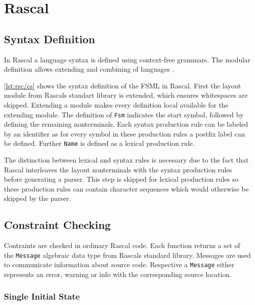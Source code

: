 \section{Rascal}

\subsection{Syntax Definition}

In Rascal a language syntax is defined using context-free grammars.
The modular definition allows extending and combining of languages \cite{van2011rascal}.

\autoref{lst:rsc/cs} shows the syntax definition of the FSML in Rascal.
First the layout module from Rascals standart library is extended, which ensures whitespaces are skipped.
Extending a module makes every definition local available for the extending module.
The definition of \lstinline[language=rascal]{Fsm} indicates the start symbol, followed by defining the remaining nonterminals.
Each syntax production rule can be labeled by an identifier as for every symbol in these production rules a postfix label can be defined.
Further \lstinline{Name} is defined as a lexical production rule.

The distinction between lexical and syntax rules is necessary due to the fact that Rascal interleaves the layout nonterminals with the syntax production rules before generating a parser.
This step is skipped for lexical production rules so these production rules can contain character sequences which would otherwise be skipped by the parser.



\subsection{Constraint Checking}

Contraints are checked in ordinary Rascal code.
Each function returns a set of the \lstinline{Message} algebraic data type from Rascals standard library.
Messages are used to communicate information about source code.
Respective a \lstinline{Message} either represents an error, warning or info with the corresponding source location.

\subsubsection{Single Initial State}

